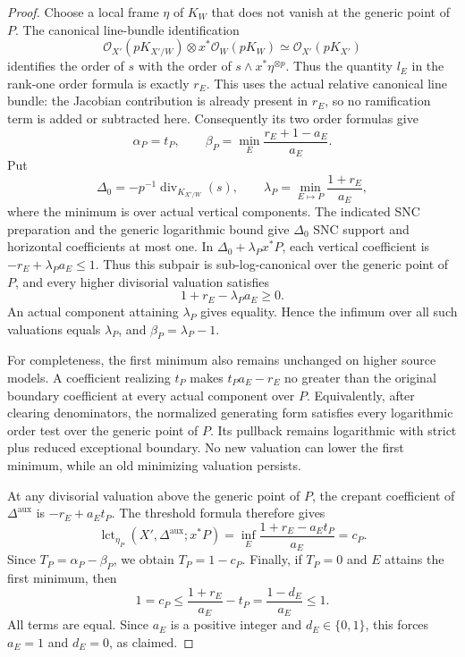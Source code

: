 \begin{proof}
Choose a local frame $\eta$ of $K_W$ that does not vanish at the generic
point of $P$. The canonical line-bundle identification
\[
 \mathcal O_{X'}(pK_{X'/W})\otimes x^*\mathcal O_W(pK_W)
       \simeq\mathcal O_{X'}(pK_{X'})
\]
identifies the order of $s$ with the order of
$s\wedge x^*\eta^{\otimes p}$. Thus the quantity $l_E$ in the
rank-one order formula is exactly $r_E$. This uses the actual relative
canonical line bundle: the Jacobian contribution is already present in
$r_E$, so no ramification term is added or subtracted here.
Consequently its two order formulas give
\[
 \alpha_P=t_P,
 \qquad
 \beta_P=\min_E\frac{r_E+1-a_E}{a_E}.
\]
Put
\[
 \Delta_0=-p^{-1}\operatorname{div}_{K_{X'/W}}(s),
 \qquad \lambda_P=\min_{E\mapsto P}\frac{1+r_E}{a_E},
\]
where the minimum is over actual vertical components. The indicated
SNC preparation and the generic logarithmic bound give $\Delta_0$ SNC
support and horizontal coefficients at most one. In
$\Delta_0+\lambda_Px^*P$, each vertical coefficient is
$-r_E+\lambda_Pa_E\leq1$. Thus this subpair is sub-log-canonical
over the generic point of $P$, and every higher divisorial valuation
satisfies
\[
                     1+r_E-\lambda_Pa_E\geq0.
\]
An actual component attaining $\lambda_P$ gives equality. Hence the
infimum over all such valuations equals $\lambda_P$, and
$\beta_P=\lambda_P-1$.

For completeness, the first minimum also remains unchanged on higher
source models. A coefficient realizing $t_P$ makes
$t_Pa_E-r_E$ no greater than the original boundary coefficient at every
actual component over $P$. Equivalently, after clearing denominators,
the normalized generating form satisfies every logarithmic order test
over the generic point of $P$. Its pullback remains logarithmic with
strict plus reduced exceptional boundary. No new valuation can lower
the first minimum, while an old minimizing valuation persists.

At any divisorial valuation above the generic point of $P$, the
crepant coefficient of $\Delta^{\mathrm{aux}}$ is $-r_E+a_Et_P$.
The threshold formula therefore gives
\[
 \operatorname{lct}_{\eta_P}(X',\Delta^{\mathrm{aux}};x^*P)
 =\inf_E\frac{1+r_E-a_Et_P}{a_E}=c_P.
\]
Since $T_P=\alpha_P-\beta_P$, we obtain $T_P=1-c_P$.
Finally, if $T_P=0$ and $E$ attains the first minimum, then
\[
 1=c_P\le\frac{1+r_E}{a_E}-t_P
       =\frac{1-d_E}{a_E}\le1.
\]
All terms are equal. Since $a_E$ is a positive integer and
$d_E\in\{0,1\}$, this forces $a_E=1$ and $d_E=0$, as claimed.
\end{proof}


